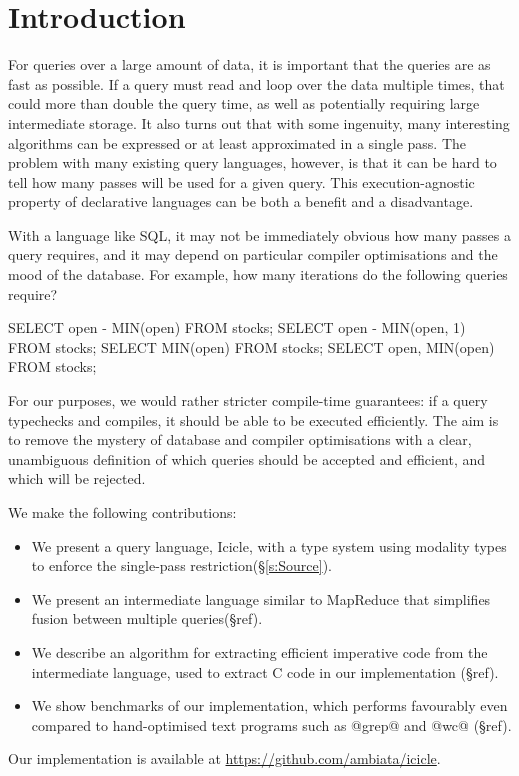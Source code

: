 \section{Introduction}
\label{s:Introduction}

For queries over a large amount of data, it is important that the queries are as fast as possible.
If a query must read and loop over the data multiple times, that could more than double the query time, as well as potentially requiring large intermediate storage.
It also turns out that with some ingenuity, many interesting algorithms can be expressed or at least approximated in a single pass.
The problem with many existing query languages, however, is that it can be hard to tell how many passes will be used for a given query.
This execution-agnostic property of declarative languages can be both a benefit and a disadvantage.

With a language like SQL, it may not be immediately obvious how many passes a query requires, and it may depend on particular compiler optimisations and the mood of the database.
For example, how many iterations do the following queries require?

\begin{code}
SELECT open - MIN(open)    FROM stocks;
SELECT open - MIN(open, 1) FROM stocks;
SELECT        MIN(open)    FROM stocks;
SELECT open,  MIN(open)    FROM stocks;
\end{code}

For our purposes, we would rather stricter compile-time guarantees: if a query typechecks and compiles, it should be able to be executed efficiently.
The aim is to remove the mystery of database and compiler optimisations with a clear, unambiguous definition of which queries should be accepted and efficient, and which will be rejected.


We make the following contributions:
\begin{itemize}
\item 
We present a query language, Icicle, with a type system using modality types to enforce the single-pass restriction(\S\ref{s:Source}).
\item
We present an intermediate language similar to MapReduce that simplifies fusion between multiple queries(\S ref).
\item
We describe an algorithm for extracting efficient imperative code from the intermediate language, used to extract C code in our implementation (\S ref).
\item
We show benchmarks of our implementation, which performs favourably even compared to hand-optimised text programs such as @grep@ and @wc@ (\S ref).
\end{itemize}

Our implementation is available at \url{https://github.com/ambiata/icicle}.

